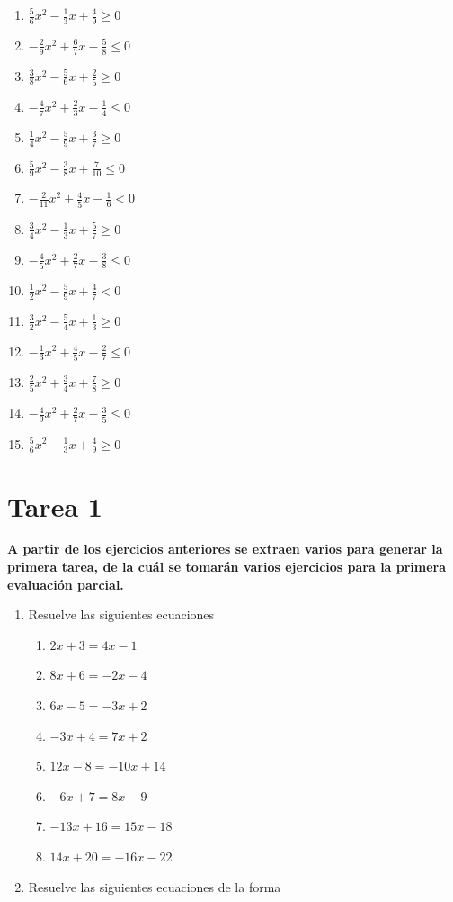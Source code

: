 \documentclass[12pt]{article}
\providecommand{\tightlist}{
  \setlength{\itemsep}{0pt}
  \setlength{\parskip}{0pt}
}
\begin{document}
{\begin{enumerate}
\def\labelenumi{\arabic{enumi}.}
\tightlist
\item
  \(\frac{5}{6}x^2 - \frac{1}{3}x + \frac{4}{9} \geq 0\)
\item
  \(-\frac{2}{9}x^2 + \frac{6}{7}x - \frac{5}{8} \leq 0\)
\item
  \(\frac{3}{8}x^2 - \frac{5}{6}x + \frac{2}{5} \geq 0\)
\item
  \(-\frac{4}{7}x^2 + \frac{2}{3}x - \frac{1}{4} \leq 0\)
\item
  \(\frac{1}{4}x^2 - \frac{5}{9}x + \frac{3}{7} \geq 0\)
\item
  \(\frac{5}{9}x^2 - \frac{3}{8}x + \frac{7}{10} \leq 0\)
\item
  \(-\frac{2}{11}x^2 + \frac{4}{5}x - \frac{1}{6} < 0\)
\item
  \(\frac{3}{4}x^2 - \frac{1}{3}x + \frac{5}{7} \geq 0\)
\item
  \(-\frac{4}{5}x^2 + \frac{2}{7}x - \frac{3}{8} \leq 0\)
\item
  \(\frac{1}{2}x^2 - \frac{5}{9}x + \frac{4}{7} < 0\)
\item
  \(\frac{3}{2}x^2 - \frac{5}{4}x + \frac{1}{3} \geq 0\)
\item
  \(-\frac{1}{3}x^2 + \frac{4}{5}x - \frac{2}{7} \leq 0\)
\item
  \(\frac{2}{5}x^2 + \frac{3}{4}x + \frac{7}{8} \geq 0\)
\item
  \(-\frac{4}{9}x^2 + \frac{2}{7}x - \frac{3}{5} \leq 0\)
\item
  \(\frac{5}{6}x^2 - \frac{1}{3}x + \frac{4}{9} \geq 0\)
\end{enumerate}

\section{Tarea 1}\label{tarea-1}

\textbf{A partir de los ejercicios anteriores se extraen varios para generar la primera tarea, de la cuál se tomarán varios ejercicios para la primera evaluación parcial.}

\begin{enumerate}
\def\labelenumi{\arabic{enumi}.}
\item
  Resuelve las siguientes ecuaciones

  \begin{enumerate}
  \def\labelenumii{\roman{enumii}.}
  \item
    \(2x + 3 = 4x - 1\)
  \item
    \(8x + 6 = -2x - 4\)
  \item
    \(6x - 5 = -3x + 2\)
  \item
    \(-3x + 4 = 7x + 2\)
  \item
    \(12x - 8 = -10x + 14\)
  \item
    \(-6x + 7 = 8x - 9\)
  \item
    \(-13x + 16 = 15x - 18\)
  \item
    \(14x + 20 = -16x - 22\)
  \end{enumerate}
\item
  Resuelve las siguientes ecuaciones de la forma


\end{enumerate}}
\end{document}
